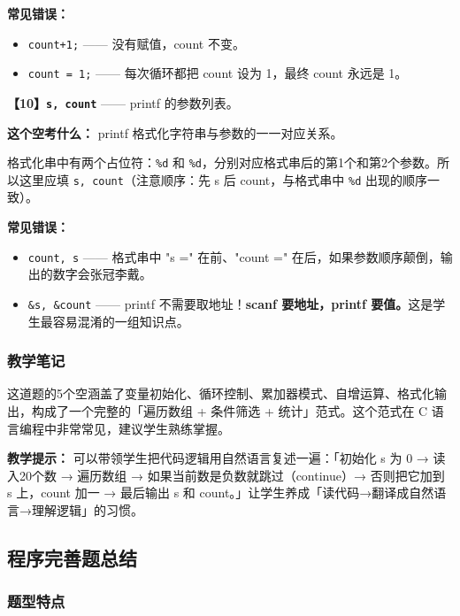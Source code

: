 \textbf{常见错误：}
\begin{itemize}
    \item \texttt{count+1;} —— 没有赋值，count 不变。
    \item \texttt{count = 1;} —— 每次循环都把 count 设为 1，最终 count 永远是 1。
\end{itemize}

\vspace{0.6em}
\textbf{【10】\texttt{s, count}} —— printf 的参数列表。

\vspace{0.3em}
\textbf{这个空考什么：} printf 格式化字符串与参数的一一对应关系。

格式化串中有两个占位符：\texttt{\%d} 和 \texttt{\%d}，分别对应格式串后的第1个和第2个参数。所以这里应填 \texttt{s, count}（注意顺序：先 s 后 count，与格式串中 \texttt{\%d} 出现的顺序一致）。

\textbf{常见错误：}
\begin{itemize}
    \item \texttt{count, s} —— 格式串中 "s =" 在前、"count =" 在后，如果参数顺序颠倒，输出的数字会张冠李戴。
    \item \texttt{\&s, \&count} —— printf 不需要取地址！\textbf{scanf 要地址，printf 要值。}这是学生最容易混淆的一组知识点。
\end{itemize}

\subsubsection{教学笔记}

这道题的5个空涵盖了变量初始化、循环控制、累加器模式、自增运算、格式化输出，构成了一个完整的「遍历数组 + 条件筛选 + 统计」范式。这个范式在 C 语言编程中非常常见，建议学生熟练掌握。

\textbf{教学提示：} 可以带领学生把代码逻辑用自然语言复述一遍：「初始化 s 为 0 → 读入20个数 → 遍历数组 → 如果当前数是负数就跳过（continue）→ 否则把它加到 s 上，count 加一 → 最后输出 s 和 count。」让学生养成「读代码→翻译成自然语言→理解逻辑」的习惯。

\bigskip
\bigskip

\subsection{程序完善题总结}

\subsubsection{题型特点}

